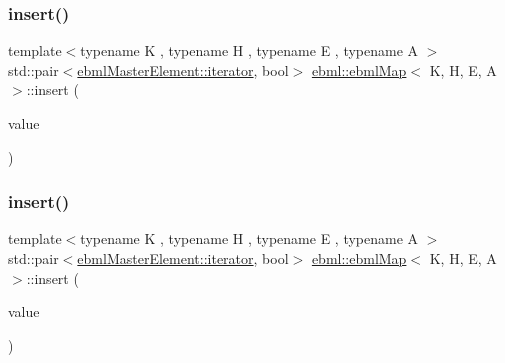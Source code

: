 \subsubsection{\texorpdfstring{insert()}{insert()}\hspace{0.1cm}{\footnotesize\ttfamily [3/6]}}
{\footnotesize\ttfamily template$<$typename K , typename H , typename E , typename A $>$ \\
std\+::pair$<$\mbox{\hyperlink{classebml_1_1ebmlMasterElement_1_1iterator}{ebml\+Master\+Element\+::iterator}}, bool$>$ \mbox{\hyperlink{classebml_1_1ebmlMap}{ebml\+::ebml\+Map}}$<$ K, H, E, A $>$\+::insert (\begin{DoxyParamCaption}\item[{const std\+::pair$<$ \mbox{\hyperlink{namespaceebml_adad533b7705a16bb360fe56380c5e7be}{ebml\+Element\+\_\+sp}}, \mbox{\hyperlink{namespaceebml_adad533b7705a16bb360fe56380c5e7be}{ebml\+Element\+\_\+sp}} $>$ \&}]{value }\end{DoxyParamCaption})}

\mbox{\label{classebml_1_1ebmlMap_add662463f1a41aec4fa22827ac1b7e7a}} 
\subsubsection{\texorpdfstring{insert()}{insert()}\hspace{0.1cm}{\footnotesize\ttfamily [4/6]}}
{\footnotesize\ttfamily template$<$typename K , typename H , typename E , typename A $>$ \\
std\+::pair$<$\mbox{\hyperlink{classebml_1_1ebmlMasterElement_1_1iterator}{ebml\+Master\+Element\+::iterator}}, bool$>$ \mbox{\hyperlink{classebml_1_1ebmlMap}{ebml\+::ebml\+Map}}$<$ K, H, E, A $>$\+::insert (\begin{DoxyParamCaption}\item[{std\+::pair$<$ \mbox{\hyperlink{namespaceebml_adad533b7705a16bb360fe56380c5e7be}{ebml\+Element\+\_\+sp}}, \mbox{\hyperlink{namespaceebml_adad533b7705a16bb360fe56380c5e7be}{ebml\+Element\+\_\+sp}} $>$ \&\&}]{value }\end{DoxyParamCaption})}

\mbox{\label{classebml_1_1ebmlMap_a9edbbe7cc8bf2eb2f5a73adaac8ce624}} 

